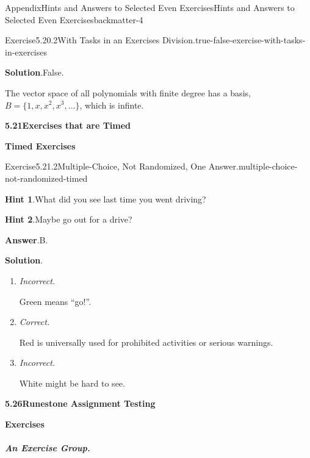 \documentclass[oneside,10pt,]{book}
\newcommand{\blocktitlefont}{\relax}
\newcommand{\lititle}[1]{{\slshape#1}}
\numberwithin{equation}{section}
\begin{document}
\begin{solutions-chapter}{Appendix}{Hints and Answers to Selected Even Exercises}{}{Hints and Answers to Selected Even Exercises}{}{}{backmatter-4}
\begin{divisionsolution}{Exercise}{5.20.2}{With Tasks in an Exercises Division.}{true-false-exercise-with-tasks-in-exercises}
\begin{enumerate}[font=\bfseries,label=(\alph*),ref=\alph*]
\par\smallskip%
\noindent\textbf{\blocktitlefont Solution}.\hypertarget{true-false-task-in-exercises-6-back}{}\quad{}False.%
\par
The vector space of all polynomials with finite degree has a basis, \(B = \{1,x,x^2,x^3,\dots\}\), which is infinte.%
\end{enumerate}%
\end{divisionsolution}%
\par\medskip
\noindent\textbf{\Large{}5.21\space\textperiodcentered\space{}Exercises that are Timed}
\par\medskip
\noindent\textbf{\large{}\textperiodcentered\space{}Timed Exercises}
\begin{divisionsolution}{Exercise}{5.21.2}{Multiple-Choice, Not Randomized, One Answer.}{multiple-choice-not-randomized-timed}%
\par\smallskip%
\noindent\textbf{\blocktitlefont Hint 1}.\hypertarget{multiple-choice-not-randomized-timed-4-back}{}\quad{}What did you see last time you went driving?%
\par\smallskip%
\noindent\textbf{\blocktitlefont Hint 2}.\hypertarget{multiple-choice-not-randomized-timed-5-back}{}\quad{}Maybe go out for a drive?%
\par\smallskip%
\noindent\textbf{\blocktitlefont Answer}.\hypertarget{multiple-choice-not-randomized-timed-6-back}{}\quad{}B.%
\par\smallskip%
\noindent\textbf{\blocktitlefont Solution}.\hypertarget{multiple-choice-not-randomized-timed-7-back}{}\quad{}%
\begin{enumerate}[label={\Alph*.}]
\item{}\lititle{Incorrect.}\par%
Green means ``go!''.%
\item{}\lititle{Correct.}\par%
Red is universally used for prohibited activities or serious warnings.%
\item{}\lititle{Incorrect.}\par%
White might be hard to see.%
\end{enumerate}
%
\end{divisionsolution}%
\par\medskip
\noindent\textbf{\Large{}5.26\space\textperiodcentered\space{}Runestone Assignment Testing}
\par\medskip
\noindent\textbf{\large{}\textperiodcentered\space{}Exercises}
\subparagraph[{An Exercise Group}]{An Exercise Group.}
\begin{exercisegroup}

\end{exercisegroup}
\end{solutions-chapter}
\end{document}
